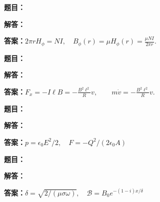 \documentclass[lang=cn,color=blue,11pt]{elegantbook}
\begin{document}
\par\smallskip\noindent\hrulefill\par\medskip
{}\par
\noindent\textbf{题目：}
\par\noindent\textbf{解答：}
\par\noindent\textbf{答案：}\(\displaystyle 
2\pi r H_\phi=NI,\quad
B_\phi(r)=\mu H_\phi(r)=\frac{\mu NI}{2\pi r}.
\)\par
\par\smallskip\noindent\hrulefill\par\medskip
{}\par
\noindent\textbf{题目：}
\par\noindent\textbf{解答：}
\par\noindent\textbf{答案：}\(\displaystyle 
F_x=-I\ell B=-\frac{B^2\ell^2}{R}v,\qquad
m\dot v=-\frac{B^2\ell^2}{R}v.
\)\par
\par\smallskip\noindent\hrulefill\par\medskip
{}\par
\noindent\textbf{题目：}
\par\noindent\textbf{解答：}
\par\noindent\textbf{答案：}\(\displaystyle p=\epsilon_0E^2/2,\quad F=-Q^2/(2\epsilon_0A)\)\par
\par\smallskip\noindent\hrulefill\par\medskip
{}\par
\noindent\textbf{题目：}
\par\noindent\textbf{解答：}
\par\noindent\textbf{答案：}\(\displaystyle \delta=\sqrt{2/(\mu\sigma\omega)},\quad\mathcal B=B_0e^{-(1-i)x/\delta}\)\par
\par\smallskip\noindent\hrulefill\par\medskip
\end{document}
